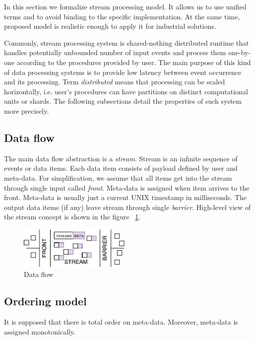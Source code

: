 
\label {fs-stream}

In this section we formalize stream processing model. It allows us to use unified terms and to avoid binding to the specific implementation. At the same time, proposed model is realistic enough to apply it for industrial solutions.

Commonly, stream processing system is shared-nothing distributed runtime that handles potentially unbounded number of input events and process them one-by-one according to the procedures provided by user. The main purpose of this kind of data processing systems is to provide low latency between event occurrence and its processing. Term {\it distributed} means that processing can be scaled horizontally, i.e. user's procedures can have partitions on distinct computational units or shards. The following subsections detail the properties of such system more precisely.  

\subsection{Data flow}
The main data flow abstraction is a {\it stream}. Stream is an infinite sequence of events or data items. Each data item consists of payload defined by user and meta-data. For simplification, we assume that all items get into the stream through single input called {\it front}. Meta-data is assigned when item arrives to the front. Meta-data is usually just a current UNIX timestamp in milliseconds. The output data items (if any) leave stream through single {\it barrier}. High-level view of the stream concept is shown in the figure ~\ref{data-flow}.

\begin{figure}[htbp]
  \centering
  \includegraphics[width=0.48\textwidth]{pics/stream}
  \caption{Data flow}
  \label {data-flow}
\end{figure}

\subsection{Ordering model}
It is supposed that there is total order on meta-data. Moreover, meta-data is assigned monotonically.

